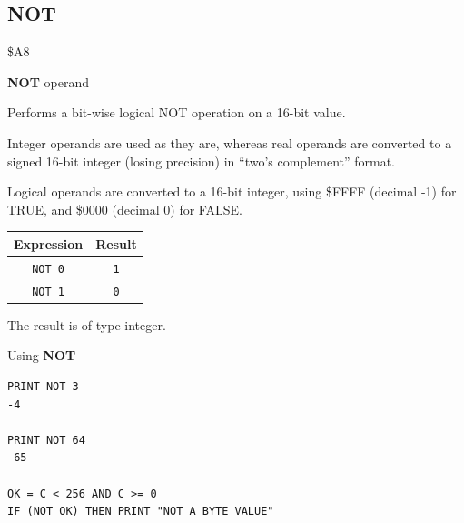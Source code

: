 
\newpage
\subsection{NOT}
\begin{description}[leftmargin=2cm,style=nextline]
\item [Token:]    \$A8

\item [Format:]   {\bf NOT} operand

\item [Usage:]    Performs a bit-wise logical NOT operation on a 16-bit value.

                  Integer operands are used as they are, whereas real operands are converted to a signed 16-bit integer (losing precision) in ``two's complement'' format.

                  Logical operands are converted to a 16-bit integer, using \$FFFF (decimal -1) for TRUE, and \$0000 (decimal 0) for FALSE.

                  \begin{center}
                  \setlength{\tabcolsep}{1mm}
                     \begin{tabular}{|c|c|}
                     \hline
                        {\bf Expression} & {\bf Result}  \\
                     \hline
                        \texttt{NOT 0}  &  \texttt{1} \\
                        \texttt{NOT 1}  &  \texttt{0} \\
                     \hline
                  \end{tabular}
                  \end{center}

\item [Remarks:]  The result is of type integer.

\item [Examples:] Using {\bf NOT}

\begin{tcolorbox}[colback=black,coltext=white]
\verbatimfont{\codefont}
\begin{verbatim}
PRINT NOT 3
-4

PRINT NOT 64
-65

OK = C < 256 AND C >= 0
IF (NOT OK) THEN PRINT "NOT A BYTE VALUE"
\end{verbatim}
\end{tcolorbox}
\end{description}

